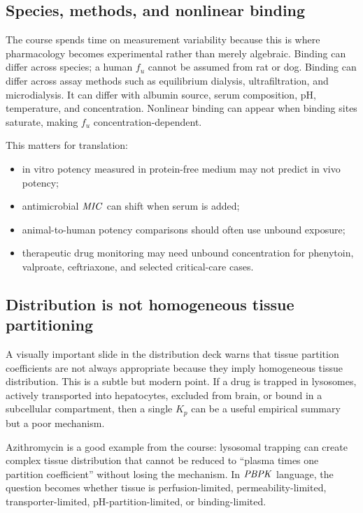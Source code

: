 \documentclass[a4paper]{article}
\newcommand{\fu}{\ensuremath{f_u}}
\newcommand{\PBPK}{\ensuremath{\pksym{PBPK}}}
\begin{document}
\subsection{Species, methods, and nonlinear binding}

The course spends time on measurement variability because this is where pharmacology becomes experimental rather than merely algebraic. Binding can differ across species; a human \(\fu\) cannot be assumed from rat or dog. Binding can differ across assay methods such as equilibrium dialysis, ultrafiltration, and microdialysis. It can differ with albumin source, serum composition, pH, temperature, and concentration. Nonlinear binding can appear when binding sites saturate, making \(\fu\) concentration-dependent.

This matters for translation:
\begin{itemize}[leftmargin=2em]
  \item in vitro potency measured in protein-free medium may not predict in vivo potency;
  \item antimicrobial \(\pksym{MIC}\) can shift when serum is added;
  \item animal-to-human potency comparisons should often use unbound exposure;
  \item therapeutic drug monitoring may need unbound concentration for phenytoin, valproate, ceftriaxone, and selected critical-care cases.
\end{itemize}

\subsection{Distribution is not homogeneous tissue partitioning}

A visually important slide in the distribution deck warns that tissue partition coefficients are not always appropriate because they imply homogeneous tissue distribution. This is a subtle but modern point. If a drug is trapped in lysosomes, actively transported into hepatocytes, excluded from brain, or bound in a subcellular compartment, then a single \(K_p\) can be a useful empirical summary but a poor mechanism.

Azithromycin is a good example from the course: lysosomal trapping can create complex tissue distribution that cannot be reduced to ``plasma times one partition coefficient'' without losing the mechanism. In \PBPK{} language, the question becomes whether tissue is perfusion-limited, permeability-limited, transporter-limited, pH-partition-limited, or binding-limited.
\end{document}
